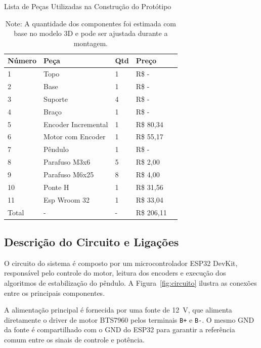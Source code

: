 \documentclass[9pt,a4paper,twocolumn,twoside]{tau-class/tau}
\begin{document}
    \begin{table}[H]
        \centering
        \caption{Lista de Peças Utilizadas na Construção do Protótipo}
        \label{tab:lista_pecas}
        \begin{tabular}{lllll}
            \toprule
            \textbf{Número} & \textbf{Peça} & \textbf{Qtd}  & \textbf{Preço} \\
            \midrule
            1  & Topo                    & 1   & R\$ - \\
            2  & Base                    & 1   & R\$ - \\
            3  & Suporte                 & 4   & R\$ - \\
            4  & Braço                   & 1   & R\$ - \\
            5  & Encoder Incremental     & 1   & R\$ 80,34 \\
            6  & Motor com Encoder       & 1   & R\$ 55,17 \\
            7  & Pêndulo                 & 1   & R\$ - \\
            8  & Parafuso M3x6           & 5   & R\$ 2,00 \\
            9  & Parafuso M6x25          & 8   & R\$ 4,00 \\
            10 & Ponte H                 & 1   & R\$ 31,56 \\
            11 & Esp Wroom 32            & 1   & R\$ 33,04 \\
            Total & -                    & -   & R\$ 206,11 \\
            \bottomrule
        \end{tabular}
        \caption*{Note: A quantidade dos componentes foi estimada com base no modelo 3D e pode ser ajustada durante a montagem.}
    \end{table}
    \vspace{-6mm}
    \subsection{Descrição do Circuito e Ligações}

    O circuito do sistema é composto por um microcontrolador ESP32 DevKit, responsável pelo controle do motor, leitura dos encoders e execução dos algoritmos de estabilização do pêndulo. A Figura~\ref{fig:circuito} ilustra as conexões entre os principais componentes.

    A alimentação principal é fornecida por uma fonte de \SI{12}{\volt}, que alimenta diretamente o driver de motor BTS7960 pelos terminais \texttt{B+} e \texttt{B-}. O mesmo GND da fonte é compartilhado com o GND do ESP32 para garantir a referência comum entre os sinais de controle e potência.
\end{document}
